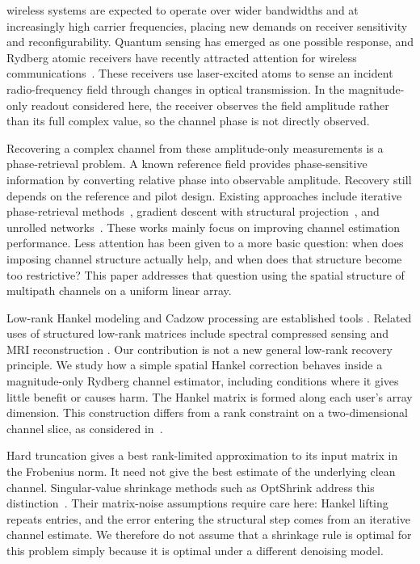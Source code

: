 \documentclass[journal]{IEEEtran}
\begin{document}
 wireless systems are expected to operate
over wider bandwidths and at increasingly high carrier frequencies, placing
new demands on receiver sensitivity and reconfigurability. Quantum sensing has
emerged as one possible response, and Rydberg atomic receivers have recently
attracted attention for wireless communications~\cite{cui2025,gong2025mag}.
These receivers use laser-excited atoms to sense an incident radio-frequency
field through changes in optical transmission. In the magnitude-only readout considered here, the receiver observes the
field amplitude rather than its full complex value, so the channel phase
is not directly observed.

Recovering a complex channel from these amplitude-only measurements is a
phase-retrieval problem. A known reference field provides phase-sensitive information
by converting relative phase into observable amplitude. Recovery still
depends on the reference and pilot design. Existing approaches
include iterative phase-retrieval methods~\cite{gerchberg1972}, gradient
descent with structural projection~\cite{xu2025}, and unrolled
networks~\cite{xiao2026}. These works mainly focus on improving channel
estimation performance. Less attention has been given to a more basic
question: when does imposing channel structure actually help, and when does
that structure become too restrictive? This paper addresses that question
using the spatial structure of multipath channels on a uniform linear array.

Low-rank Hankel modeling and Cadzow processing are established tools
\cite{cadzow1988,markovsky2008}. Related uses of structured low-rank
matrices include spectral compressed sensing and MRI reconstruction
\cite{chen2014emac,jin2016aloha,haldar2014loraks}. Our contribution is not
a new general low-rank recovery principle. We study how a simple spatial
Hankel correction behaves inside a magnitude-only Rydberg channel
estimator, including conditions where it gives little benefit or causes
harm. The Hankel matrix is formed along each user's array dimension.
This construction differs from a rank constraint on a two-dimensional
channel slice, as considered in~\cite{xu2025}.

Hard truncation gives a best rank-limited approximation to its input
matrix in the Frobenius norm. It need not give the best estimate of the
underlying clean channel. Singular-value shrinkage methods such as
OptShrink address this distinction~\cite{nadakuditi2014optshrink}. Their
matrix-noise assumptions require care here: Hankel lifting repeats
entries, and the error entering the structural step comes from an
iterative channel estimate. We therefore do not assume that a shrinkage
rule is optimal for this problem simply because it is optimal under a
different denoising model.
\end{document}
